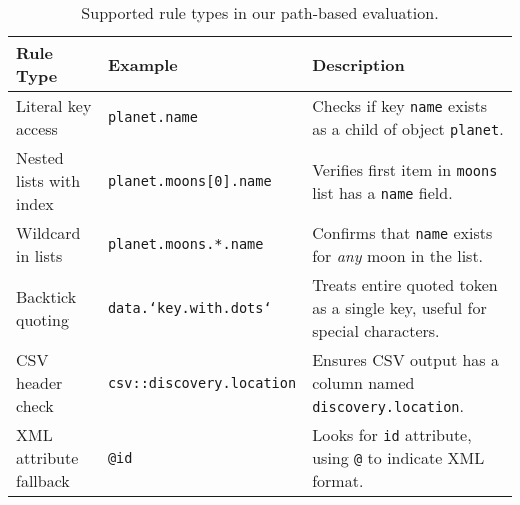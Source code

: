 \begin{table*}[t]
\centering
\small
\begin{tabular}{p{3.2cm}p{3.5cm}p{8cm}}
\toprule
\textbf{Rule Type} & \textbf{Example} & \textbf{Description} \\
\midrule
Literal key access & \texttt{planet.name} & Checks if key \texttt{name} exists as a child of object \texttt{planet}. \\
Nested lists with index & \texttt{planet.moons[0].name} & Verifies first item in \texttt{moons} list has a \texttt{name} field. \\
Wildcard in lists & \texttt{planet.moons.*.name} & Confirms that \texttt{name} exists for \textit{any} moon in the list. \\
Backtick quoting & \texttt{data.`key.with.dots`} & Treats entire quoted token as a single key, useful for special characters. \\
CSV header check & \texttt{csv::discovery.location} & Ensures CSV output has a column named \texttt{discovery.location}. \\
XML attribute fallback & \texttt{@id} & Looks for \texttt{id} attribute, using \texttt{@} to indicate XML format. \\
\bottomrule
\end{tabular}
\caption{Supported rule types in our path-based evaluation.}
\label{tab:path_checker}
\end{table*}